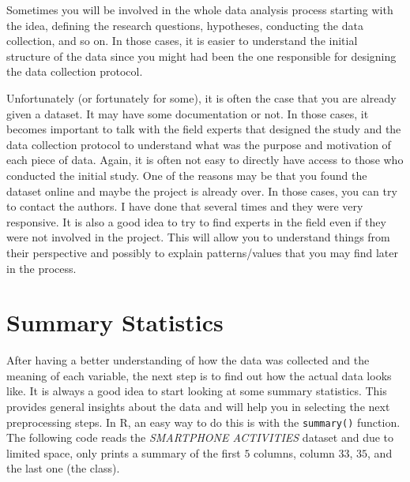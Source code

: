 \documentclass[
  11pt,
]{krantz}
\begin{document}
Sometimes you will be involved in the whole data analysis process starting with the idea, defining the research questions, hypotheses, conducting the data collection, and so on. In those cases, it is easier to understand the initial structure of the data since you might had been the one responsible for designing the data collection protocol.

Unfortunately (or fortunately for some), it is often the case that you are already given a dataset. It may have some documentation or not. In those cases, it becomes important to talk with the field experts that designed the study and the data collection protocol to understand what was the purpose and motivation of each piece of data. Again, it is often not easy to directly have access to those who conducted the initial study. One of the reasons may be that you found the dataset online and maybe the project is already over. In those cases, you can try to contact the authors. I have done that several times and they were very responsive. It is also a good idea to try to find experts in the field even if they were not involved in the project. This will allow you to understand things from their perspective and possibly to explain patterns/values that you may find later in the process.

\hypertarget{summary-statistics}{%
\section{Summary Statistics}\label{summary-statistics}}

After having a better understanding of how the data was collected and the meaning of each variable, the next step is to find out how the actual data looks like. It is always a good idea to start looking at some summary statistics. This provides general insights about the data and will help you in selecting the next preprocessing steps. In R, an easy way to do this is with the \texttt{summary()} function. The following code reads the \emph{SMARTPHONE ACTIVITIES} dataset and due to limited space, only prints a summary of the first \(5\) columns, column \(33\), \(35\), and the last one (the class).
\end{document}
